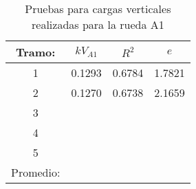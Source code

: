 \documentclass[main]{subfiles}
\begin{document}
\begin{table}[!hdpb]
\caption{Pruebas para cargas verticales realizadas para la rueda A1}
\begin{center}
\begin{tabular}{|c|c|c|c|}\hline
Tramo: & $kV_{A1}$  & $R^2$ & $e$\\ \hline
1& 0.1293 & 0.6784 & 1.7821 \\ \hline
2& 0.1270 & 0.6738 & 2.1659 \\ \hline
3&  & \\ \hline
4&  & \\ \hline
5&  & \\ \hline
Promedio: &  & \\ \hline

\end{tabular}
\end{center}
\end{table}
\end{document}
